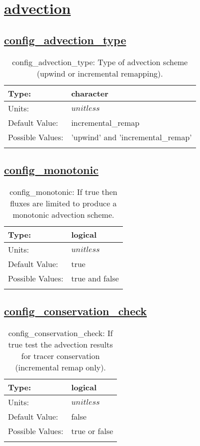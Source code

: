 \section[advection]{\hyperref[sec:nm_tab_advection]{advection}}
\label{sec:nm_sec_advection}
\subsection[config\_advection\_type]{\hyperref[sec:nm_tab_advection]{config\_advection\_type}}
\label{subsec:nm_sec_config_advection_type}
\begin{center}
\begin{longtable}{| p{2.0in} || p{4.0in} |}
    \hline
    Type: & character \\
    \hline
    Units: & $unitless$ \\
    \hline
    Default Value: & incremental\_remap \\
    \hline
    Possible Values: & 'upwind' and 'incremental\_remap' \\
    \hline
    \caption{config\_advection\_type: Type of advection scheme (upwind or incremental remapping).}
\end{longtable}
\end{center}
\subsection[config\_monotonic]{\hyperref[sec:nm_tab_advection]{config\_monotonic}}
\label{subsec:nm_sec_config_monotonic}
\begin{center}
\begin{longtable}{| p{2.0in} || p{4.0in} |}
    \hline
    Type: & logical \\
    \hline
    Units: & $unitless$ \\
    \hline
    Default Value: & true \\
    \hline
    Possible Values: & true and false \\
    \hline
    \caption{config\_monotonic: If true then fluxes are limited to produce a monotonic advection scheme.}
\end{longtable}
\end{center}
\subsection[config\_conservation\_check]{\hyperref[sec:nm_tab_advection]{config\_conservation\_check}}
\label{subsec:nm_sec_config_conservation_check}
\begin{center}
\begin{longtable}{| p{2.0in} || p{4.0in} |}
    \hline
    Type: & logical \\
    \hline
    Units: & $unitless$ \\
    \hline
    Default Value: & false \\
    \hline
    Possible Values: & true or false \\
    \hline
    \caption{config\_conservation\_check: If true test the advection results for tracer conservation (incremental remap only).}
\end{longtable}
\end{center}
